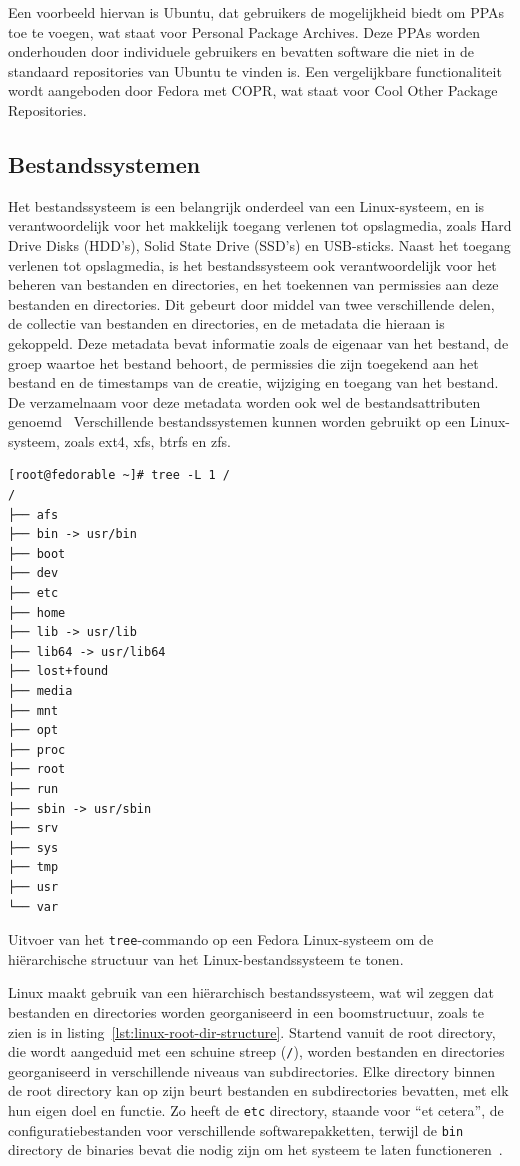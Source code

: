 Een voorbeeld hiervan is Ubuntu, dat gebruikers de mogelijkheid biedt om PPAs toe te voegen, wat staat voor Personal Package Archives.
Deze PPAs worden onderhouden door individuele gebruikers en bevatten software die niet in de standaard repositories van Ubuntu te vinden is.
Een vergelijkbare functionaliteit wordt aangeboden door Fedora met COPR, wat staat voor Cool Other Package Repositories.

\subsection{Bestandssystemen}
\label{linux_bestandssystemen}

Het bestandssysteem is een belangrijk onderdeel van een Linux-systeem, en is verantwoordelijk voor het makkelijk toegang verlenen tot opslagmedia, zoals Hard Drive Disks (HDD's), Solid State Drive (SSD's) en USB-sticks.
Naast het toegang verlenen tot opslagmedia, is het bestandssysteem ook verantwoordelijk voor het beheren van bestanden en directories, en het toekennen van permissies aan deze bestanden en directories.
Dit gebeurt door middel van twee verschillende delen, de collectie van bestanden en directories, en de metadata die hieraan is gekoppeld.
Deze metadata bevat informatie zoals de eigenaar van het bestand, de groep waartoe het bestand behoort, de permissies die zijn toegekend aan het bestand en de timestamps van de creatie, wijziging en toegang van het bestand.
De verzamelnaam voor deze metadata worden ook wel de bestandsattributen genoemd~\autocite{silberschatz2013os}
Verschillende bestandssystemen kunnen worden gebruikt op een Linux-systeem, zoals ext4, xfs, btrfs en zfs.

\begin{listing}
  \begin{verbatim}
[root@fedorable ~]# tree -L 1 /
/
├── afs
├── bin -> usr/bin
├── boot
├── dev
├── etc
├── home
├── lib -> usr/lib
├── lib64 -> usr/lib64
├── lost+found
├── media
├── mnt
├── opt
├── proc
├── root
├── run
├── sbin -> usr/sbin
├── srv
├── sys
├── tmp
├── usr
└── var
  \end{verbatim}
  \caption{Uitvoer van het \texttt{tree}-commando op een Fedora Linux-systeem om de hi\"erarchische structuur van het Linux-bestandssysteem te tonen.}
  \label{lst:linux-root-dir-structure}
\end{listing}

Linux maakt gebruik van een hi\"erarchisch bestandssysteem, wat wil zeggen dat bestanden en directories worden georganiseerd in een boomstructuur, zoals te zien is in listing~\ref{lst:linux-root-dir-structure}.
Startend vanuit de root directory, die wordt aangeduid met een schuine streep (\texttt{/}), worden bestanden en directories georganiseerd in verschillende niveaus van subdirectories.
Elke directory binnen de root directory kan op zijn beurt bestanden en subdirectories bevatten, met elk hun eigen doel en functie.
Zo heeft de \texttt{etc} directory, staande voor ``et cetera'', de configuratiebestanden voor verschillende softwarepakketten, terwijl de \texttt{bin} directory de binaries bevat die nodig zijn om het systeem te laten functioneren~\autocite{linuxfoundation-filesystem}.

